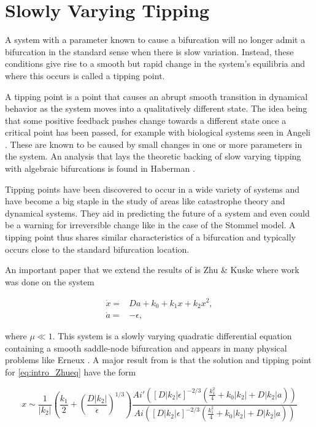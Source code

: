 \section*{Slowly Varying Tipping}
A system with a parameter known to cause a bifurcation will no longer admit a bifurcation in the standard sense when there is slow variation. Instead, these conditions give rise to a smooth but rapid change in the system's equilibria and where this occurs is called a tipping point.

A tipping point is a point that causes an abrupt smooth transition in dynamical behavior as the system moves into a qualitatively different state. The idea being that some positive feedback pushes change towards a different state once a critical point has been passed, for example with biological systems seen in Angeli \cite{angeli2004detection}. These are known to be caused by small changes in one or more parameters in the system. An analysis that lays the theoretic backing of slow varying tipping with algebraic bifurcations is found in Haberman \cite{haberman1979slowly}.

Tipping points have been discovered to occur in a wide variety of systems and have become a big staple in the study of areas like catastrophe theory and dynamical systems. They aid in predicting the future of a system and even could be a warning for irreversible change like in the case of the Stommel model. A tipping point thus shares similar characteristics of a bifurcation and typically occurs close to the standard bifurcation location.

An important paper that we extend the results of is Zhu \& Kuske \cite{zhu2015tipping} where work was done on the system

\begin{equation}\label{eq:intro_Zhueq}
\begin{aligned}
\dot{x} =& Da + k_0 +k_1 x + k_2 x^2,\\
\dot{a} =& -\epsilon,
\end{aligned}
\end{equation}

where $\mu\ll 1$. This system is a slowly varying quadratic differential equation containing a smooth saddle-node bifurcation and appears in many physical problems like Erneux \cite{erneux1989jump}. A major result from \cite{zhu2015tipping} is that the solution and tipping point for \eqref{eq:intro_Zhueq} have the form

\begin{equation}\label{eq:intro_Zhuairy}
x\sim \frac{1}{|k_2|}\left(\frac{k_1}{2}+\left(\frac{D|k_2|}{\epsilon}\right)^{1/3}\right)\frac{Ai'\left([D|k_2|\epsilon]^{-2/3}\left(\frac{k_1^2}{4}+k_0|k_2|+D|k_2|a\right)\right)}{Ai\left([D|k_2|\epsilon]^{-2/3}\left(\frac{k_1^2}{4}+k_0|k_2|+D|k_2|a\right)\right)}
\end{equation}

